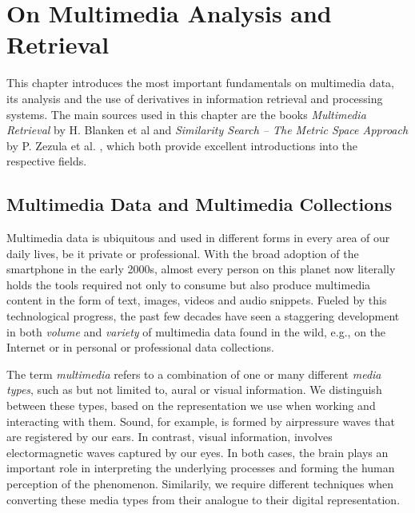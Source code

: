 \chapter{On Multimedia Analysis and Retrieval}
\label{chapter:theory_multimedia_analysis_and_retrieval}

This chapter introduces the most important fundamentals on multimedia data, its analysis and the use of derivatives in information retrieval and processing systems. The main sources used in this chapter are the books \emph{Multimedia Retrieval} by H. Blanken et al \cite{Blanken:2007multimedia} and \emph{Similarity Search -- The Metric Space Approach} by P. Zezula et al. \cite{Zezula:2006similarity}, which both provide excellent introductions into the respective fields.


\section{Multimedia Data and Multimedia Collections}
\label{section:multmedia_data}

Multimedia data is ubiquitous and used in different forms in every area of our daily lives, be it private or professional. With the broad adoption of the smartphone in the early 2000s, almost every person on this planet now literally holds the tools required not only to consume but also produce multimedia content in the form of text, images, videos and audio snippets. Fueled by this technological progress, the past few decades have seen a staggering development in both \emph{volume} and \emph{variety} of multimedia data found in the wild, e.g., on the Internet or in personal or professional data collections. 

The term \emph{multimedia} refers to a combination of one or many different \emph{media types}, such as but not limited to, aural or visual information. We distinguish between these types, based on the representation we use when working and interacting with them. Sound, for example, is formed by airpressure waves that are registered by our ears. In contrast, visual information, involves electormagnetic waves captured by our eyes. In both cases, the brain plays an important role in interpreting the underlying processes and forming the human perception of the phenomenon. Similarily, we require different techniques when converting these media types from their analogue to their digital representation. 

